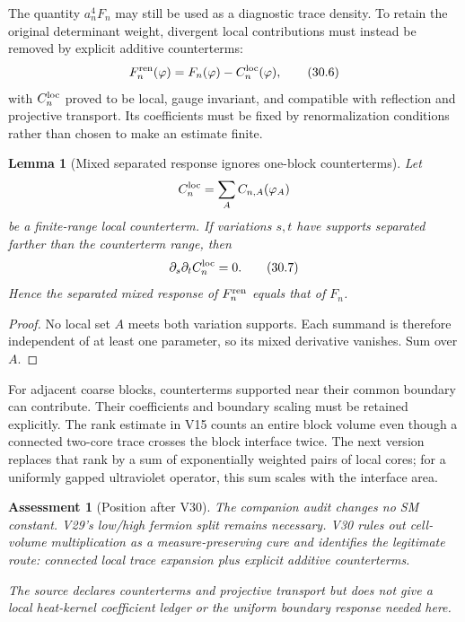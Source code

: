 \documentclass[11pt]{article}
\newtheorem{lemma}[theorem]{Lemma}
\newtheorem{assessment}[theorem]{Assessment}
\theoremstyle{remark}
\begin{document}
The quantity \(a_n^4F_n\) may still be used as a diagnostic trace
density.  To retain the original determinant weight, divergent
local contributions must instead be removed by explicit additive
counterterms:
\[
 F_n^{\rm ren}(\varphi)
 =
 F_n(\varphi)-C_n^{\rm loc}(\varphi),                      \tag{30.6}
\]
with \(C_n^{\rm loc}\) proved to be local, gauge invariant, and
compatible with reflection and projective transport.  Its
coefficients must be fixed by renormalization conditions rather
than chosen to make an estimate finite.

\begin{lemma}[Mixed separated response ignores one-block
counterterms]
\label{lem:v15v30-counterterm}
Let
\[
 C_n^{\rm loc}=\sum_A C_{n,A}(\varphi_A)
\]
be a finite-range local counterterm.  If variations \(s,t\) have
supports separated farther than the counterterm range, then
\[
 \partial_s\partial_t C_n^{\rm loc}=0.                     \tag{30.7}
\]
Hence the separated mixed response of \(F_n^{\rm ren}\) equals that
of \(F_n\).
\end{lemma}

\begin{proof}
No local set \(A\) meets both variation supports.  Each summand is
therefore independent of at least one parameter, so its mixed
derivative vanishes.  Sum over \(A\).
\end{proof}

For adjacent coarse blocks, counterterms supported near their common
boundary can contribute.  Their coefficients and boundary scaling
must be retained explicitly.  The rank estimate in V15 counts an
entire block volume even though a connected two-core trace crosses
the block interface twice.  The next version replaces that rank by
a sum of exponentially weighted pairs of local cores; for a
uniformly gapped ultraviolet operator, this sum scales with the
interface area.

\begin{assessment}[Position after V30]
\label{ass:v15v30-position}
The companion audit changes no SM constant.  V29's low/high
fermion split remains necessary.  V30 rules out cell-volume
multiplication as a measure-preserving cure and identifies the
legitimate route: connected local trace expansion plus explicit
additive counterterms.

The source declares counterterms and projective transport but does
not give a local heat-kernel coefficient ledger or the uniform
boundary response needed here.
\end{assessment}
\end{document}

